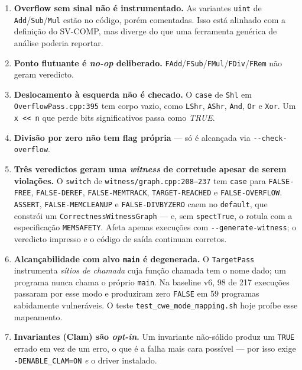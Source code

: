 \documentclass[11pt,a4paper]{article}
\newcommand{\code}[1]{\texttt{#1}}
\newcommand{\flag}[1]{\texttt{-\/-#1}}
\newcommand{\src}[1]{{\small\texttt{#1}}}
\begin{document}
\begin{enumerate}[leftmargin=*,itemsep=3pt]
  \item \textbf{Overflow sem sinal não é instrumentado.} As variantes
        \code{uint} de \code{Add}/\code{Sub}/\code{Mul} estão no código, porém
        comentadas. Isso está alinhado com a definição do SV-COMP, mas diverge
        do que uma ferramenta genérica de análise poderia reportar.
  \item \textbf{Ponto flutuante é \emph{no-op} deliberado.}
        \code{FAdd}/\code{FSub}/\code{FMul}/\code{FDiv}/\code{FRem} não geram
        veredicto.
  \item \textbf{Deslocamento à esquerda não é checado.} O \code{case} de
        \code{Shl} em \src{OverflowPass.cpp:395} tem corpo vazio, como
        \code{LShr}, \code{AShr}, \code{And}, \code{Or} e \code{Xor}. Um
        \code{x << n} que perde bits significativos passa como \emph{TRUE}.
  \item \textbf{Divisão por zero não tem flag própria} --- só é alcançada via
        \flag{check-overflow}.
  \item \textbf{Três veredictos geram uma \emph{witness} de corretude apesar de
        serem violações.} O \code{switch} de
        \src{witness/graph.cpp:208--237} tem \code{case} para
        \code{FALSE-FREE}, \code{FALSE-DEREF}, \code{FALSE-MEMTRACK},
        \code{TARGET-REACHED} e \code{FALSE-OVERFLOW}. \code{ASSERT},
        \code{FALSE-MEMCLEANUP} e \code{FALSE-DIVBYZERO} caem no
        \code{default}, que constrói um \code{CorrectnessWitnessGraph} --- e,
        sem \code{spectTrue}, o rotula com a especificação \code{MEMSAFETY}.
        Afeta apenas execuções com \flag{generate-witness}; o veredicto
        impresso e o código de saída continuam corretos.
  \item \textbf{Alcançabilidade com alvo \code{main} é degenerada.} O
        \code{TargetPass} instrumenta \emph{sítios de chamada} cuja função
        chamada tem o nome dado; um programa nunca chama o próprio \code{main}.
        Na baseline v6, 98 de 217 execuções passaram por esse modo e produziram
        zero \code{FALSE} em 59 programas sabidamente vulneráveis. O teste
        \src{test\_cwe\_mode\_mapping.sh} hoje proíbe esse mapeamento.
  \item \textbf{Invariantes (Clam) são \emph{opt-in}.} Um invariante não-sólido
        produz um \code{TRUE} errado em vez de um erro, o que é a falha mais
        cara possível --- por isso exige \code{-DENABLE\_CLAM=ON} \emph{e} o
        driver instalado.

\end{enumerate}
\end{document}
